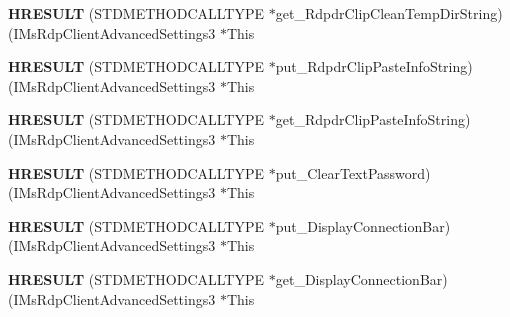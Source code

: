 \begin{DoxyCompactItemize}
\item 
\mbox{\label{struct_i_ms_rdp_client_advanced_settings3_vtbl_aeba9fe4e2ccd168fdc17e0daea43d958}} 
{\bfseries H\+R\+E\+S\+U\+LT} (S\+T\+D\+M\+E\+T\+H\+O\+D\+C\+A\+L\+L\+T\+Y\+PE $\ast$get\+\_\+\+Rdpdr\+Clip\+Clean\+Temp\+Dir\+String)(I\+Ms\+Rdp\+Client\+Advanced\+Settings3 $\ast$This
\item 
\mbox{\label{struct_i_ms_rdp_client_advanced_settings3_vtbl_ad34468f026774061aa4d5d0e3fe79418}} 
{\bfseries H\+R\+E\+S\+U\+LT} (S\+T\+D\+M\+E\+T\+H\+O\+D\+C\+A\+L\+L\+T\+Y\+PE $\ast$put\+\_\+\+Rdpdr\+Clip\+Paste\+Info\+String)(I\+Ms\+Rdp\+Client\+Advanced\+Settings3 $\ast$This
\item 
\mbox{\label{struct_i_ms_rdp_client_advanced_settings3_vtbl_a463588a407e528ad15a0a40f7805551f}} 
{\bfseries H\+R\+E\+S\+U\+LT} (S\+T\+D\+M\+E\+T\+H\+O\+D\+C\+A\+L\+L\+T\+Y\+PE $\ast$get\+\_\+\+Rdpdr\+Clip\+Paste\+Info\+String)(I\+Ms\+Rdp\+Client\+Advanced\+Settings3 $\ast$This
\item 
\mbox{\label{struct_i_ms_rdp_client_advanced_settings3_vtbl_a120da5ca36100d43fd032ba575a26c01}} 
{\bfseries H\+R\+E\+S\+U\+LT} (S\+T\+D\+M\+E\+T\+H\+O\+D\+C\+A\+L\+L\+T\+Y\+PE $\ast$put\+\_\+\+Clear\+Text\+Password)(I\+Ms\+Rdp\+Client\+Advanced\+Settings3 $\ast$This
\item 
\mbox{\label{struct_i_ms_rdp_client_advanced_settings3_vtbl_a58238dc3454ed50e2371af0519c791ab}} 
{\bfseries H\+R\+E\+S\+U\+LT} (S\+T\+D\+M\+E\+T\+H\+O\+D\+C\+A\+L\+L\+T\+Y\+PE $\ast$put\+\_\+\+Display\+Connection\+Bar)(I\+Ms\+Rdp\+Client\+Advanced\+Settings3 $\ast$This
\item 
\mbox{\label{struct_i_ms_rdp_client_advanced_settings3_vtbl_a2c0831991aafc0290b02b0a834a4886c}} 
{\bfseries H\+R\+E\+S\+U\+LT} (S\+T\+D\+M\+E\+T\+H\+O\+D\+C\+A\+L\+L\+T\+Y\+PE $\ast$get\+\_\+\+Display\+Connection\+Bar)(I\+Ms\+Rdp\+Client\+Advanced\+Settings3 $\ast$This
\item 
\mbox{\label{struct_i_ms_rdp_client_advanced_settings3_vtbl_ad6e7610ce6393d773532dd99afcf071b}} 

\end{DoxyCompactItemize}
